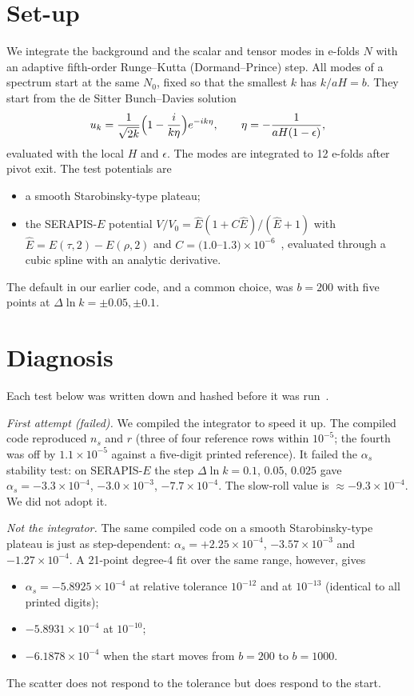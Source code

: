\documentclass[aps,prd,twocolumn,superscriptaddress,nofootinbib,showkeys]{revtex4-2}
\begin{document}
\section{Set-up}
We integrate the background and the scalar and tensor modes in e-folds $N$ with an adaptive fifth-order Runge--Kutta (Dormand--Prince) step. All modes of a spectrum start at the same $N_0$, fixed so that the smallest $k$ has $k/aH=b$. They start from the de Sitter Bunch--Davies solution
\begin{equation}
u_k=\frac{1}{\sqrt{2k}}\Bigl(1-\frac{i}{k\eta}\Bigr)e^{-ik\eta},\qquad \eta=-\frac{1}{aH(1-\epsilon)},
\end{equation}
evaluated with the local $H$ and $\epsilon$. The modes are integrated to 12 e-folds after pivot exit. The test potentials are
\begin{itemize}
\item a smooth Starobinsky-type plateau;
\item the SERAPIS-$E$ potential $V/V_0=\hat E(1+C\hat E)/(\hat E+1)$ with $\hat E=E(\tau,2)-E(\rho,2)$ and $C=(1.0$--$1.3)\times10^{-6}$~\cite{P3}, evaluated through a cubic spline with an analytic derivative.
\end{itemize}
The default in our earlier code, and a common choice, was $b=200$ with five points at $\Delta\ln k=\pm0.05,\pm0.1$.

\section{Diagnosis}
Each test below was written down and hashed before it was run~\cite{P4}.

\emph{First attempt (failed).} We compiled the integrator to speed it up. The compiled code reproduced $n_s$ and $r$ (three of four reference rows within $10^{-5}$; the fourth was off by $1.1\times10^{-5}$ against a five-digit printed reference). It failed the $\alpha_s$ stability test: on SERAPIS-$E$ the step $\Delta\ln k=0.1$, $0.05$, $0.025$ gave $\alpha_s=-3.3\times10^{-4}$, $-3.0\times10^{-3}$, $-7.7\times10^{-4}$. The slow-roll value is $\approx-9.3\times10^{-4}$. We did not adopt it.

\emph{Not the integrator.} The same compiled code on a smooth Starobinsky-type plateau is just as step-dependent: $\alpha_s=+2.25\times10^{-4}$, $-3.57\times10^{-3}$ and $-1.27\times10^{-4}$. A 21-point degree-4 fit over the same range, however, gives
\begin{itemize}
\item $\alpha_s=-5.8925\times10^{-4}$ at relative tolerance $10^{-12}$ and at $10^{-13}$ (identical to all printed digits);
\item $-5.8931\times10^{-4}$ at $10^{-10}$;
\item $-6.1878\times10^{-4}$ when the start moves from $b=200$ to $b=1000$.
\end{itemize}
The scatter does not respond to the tolerance but does respond to the start.
\end{document}
